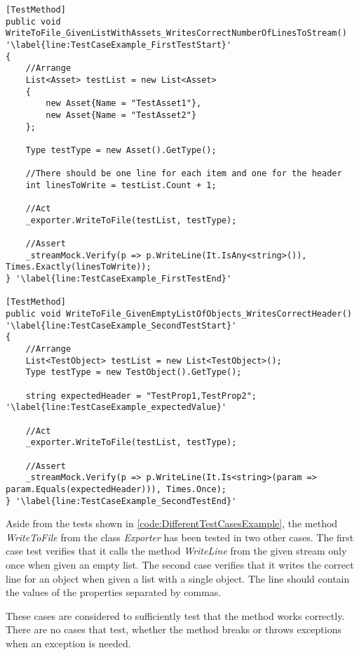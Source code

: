 \begin{listing}[H]
\begin{verbatim}
[TestMethod]
public void WriteToFile_GivenListWithAssets_WritesCorrectNumberOfLinesToStream() '\label{line:TestCaseExample_FirstTestStart}'
{
    //Arrange
    List<Asset> testList = new List<Asset>
    {
        new Asset{Name = "TestAsset1"}, 
        new Asset{Name = "TestAsset2"}
    };
    
    Type testType = new Asset().GetType();
    
    //There should be one line for each item and one for the header
    int linesToWrite = testList.Count + 1;

    //Act
    _exporter.WriteToFile(testList, testType);
            
    //Assert
    _streamMock.Verify(p => p.WriteLine(It.IsAny<string>()), Times.Exactly(linesToWrite));
} '\label{line:TestCaseExample_FirstTestEnd}'

[TestMethod]
public void WriteToFile_GivenEmptyListOfObjects_WritesCorrectHeader() '\label{line:TestCaseExample_SecondTestStart}'
{
    //Arrange
    List<TestObject> testList = new List<TestObject>();
    Type testType = new TestObject().GetType();

    string expectedHeader = "TestProp1,TestProp2"; '\label{line:TestCaseExample_expectedValue}'

    //Act
    _exporter.WriteToFile(testList, testType);
        
    //Assert
    _streamMock.Verify(p => p.WriteLine(It.Is<string>(param => param.Equals(expectedHeader))), Times.Once);
} '\label{line:TestCaseExample_SecondTestEnd}'
\end{verbatim}
\label{code:DifferentTestCasesExample}
\end{listing}

Aside from the tests shown in \autoref{code:DifferentTestCasesExample}, the method \textit{WriteToFile} from the class \textit{Exporter} has been tested in two other cases. The first case test verifies that it calls the method \textit{WriteLine} from the given stream only once when given an empty list. The second case verifies that it writes the correct line for an object when given a list with a single object. The line should contain the values of the properties separated by commas. 
\par
These cases are considered to sufficiently test that the method works correctly. There are no cases that test, whether the method breaks or throws exceptions when an exception is needed. 